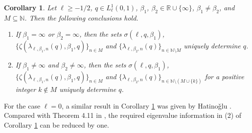 \documentclass[reqno,12pt,centertags]{amsart}
\numberwithin{equation}{section}
\newtheorem{corollary}[theorem]{Corollary}
\theoremstyle{definition}
\begin{document}
\begin{corollary}\label{t5.7}
Let $\ell\geq-1/2$, $q\in L_{\ell}^{1}(0,1)$, $\beta_{1}$, $\beta_{2}\in\mathbb{R}\cup\{\infty\}$, $\beta_{1}\neq\beta_{2}$, and $M\subseteq\mathbb{N}$. Then the following conclusions hold.
\begin{enumerate}[label=\textnormal{(\arabic*)}.]
\item If $\beta_{1}=\infty$ or $\beta_{2}=\infty$, then the sets $\sigma(\ell, q, \beta_1)$, $\{\zeta(\lambda_{\ell, \beta_{1}, n}(q),\beta_{1}, q)\}_{n\in M}$ and $\{\lambda_{\ell, \beta_{2}, n}(q)\}_{n\in\mathbb{N}\setminus M}$ uniquely determine $q$.
\item If $\beta_{1}\neq\infty$ and $\beta_{2}\neq\infty$, then the sets $\sigma(\ell, q, \beta_1)$, $\{\zeta(\lambda_{\ell, \beta_{1}, n}(q),\beta_{1}, q)\}_{n\in M}$ and $\{\lambda_{\ell, \beta_{2}, n}(q)\}_{n\in\mathbb{N}\setminus (M\cup\{k\})}$ for a positive integer $k\notin M$ uniquely determine $q$.
\end{enumerate}
\end{corollary}

For the case $\ell=0$, a similar result in Corollary \ref{t5.7} was given by Hatino\v{g}lu \cite[Theorems 4.2 and 4.11]{Hat2021}. Compared with Theorem 4.11 in \cite{Hat2021}, the required eigenvalue information in (2) of Corollary \ref{t5.7} can be reduced by one.
\end{document}
